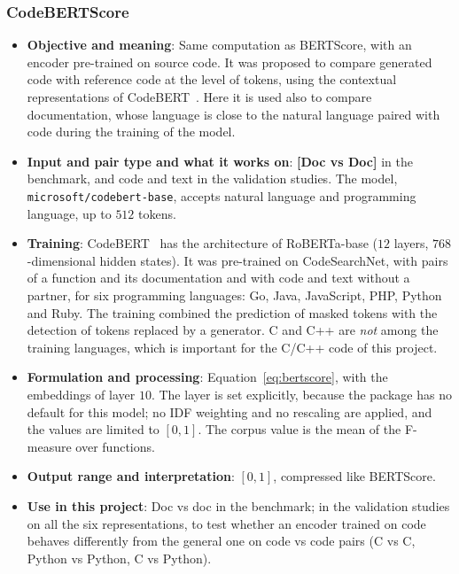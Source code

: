 \subsubsection{CodeBERTScore}
\label{subsubsec:codebertscore}
\begin{itemize}[leftmargin=*, label=\textbullet]
	\item \textbf{Objective and meaning}: Same computation as BERTScore, with an encoder
	pre-trained on source code. It was proposed to compare generated code with reference code at the
	level of tokens, using the contextual representations of CodeBERT~\cite{zhou_codebertscore_2023,
	zhang_deep_2024}. Here it is used also to compare documentation, whose language is close to
	the natural language paired with code during the training of the model.

	\item \textbf{Input and pair type and what it works on}: \textbf{[Doc vs Doc]} in the benchmark,
	and code and text in the validation studies. The model, \texttt{microsoft/codebert-base}, accepts
	natural language and programming language, up to $512$ tokens.

	\item \textbf{Training}: CodeBERT~\cite{feng_codebert_2020} has the architecture of RoBERTa-base
	($12$ layers, $768$-dimensional hidden states). It was pre-trained on CodeSearchNet, with pairs of
	a function and its documentation and with code and text without a partner, for six programming
	languages: Go, Java, JavaScript, PHP, Python and Ruby. The training combined the prediction of
	masked tokens with the detection of tokens replaced by a generator. C and C++ are \emph{not}
	among the training languages, which is important for the C/C++ code of this project.

	\item \textbf{Formulation and processing}: Equation~\eqref{eq:bertscore}, with the embeddings of
	layer $10$. The layer is set explicitly, because the package has no default for this model; no
	IDF weighting and no rescaling are applied, and the values are limited to $[0,1]$. The corpus
	value is the mean of the F-measure over functions.

	\item \textbf{Output range and interpretation}: $[0,1]$, compressed like BERTScore.

	\item \textbf{Use in this project}: Doc vs doc in the benchmark; in the validation studies on all
	the six representations, to test whether an encoder trained on code behaves differently from the
	general one on code vs code pairs (C vs C, Python vs Python, C vs Python).


\end{itemize}
